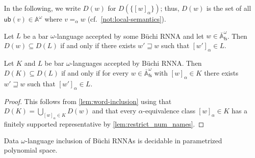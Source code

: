 \documentclass[final,a4paper,UKenglish,thm-restate,autoref,numberwithinsect]{lipics-v2021}
\newcommand{\barA}{\overline{\names}}
\newcommand{\ub}{\mathsf{ub}}
\numberwithin{equation}{section}
\newcommand{\seq}{\subseteq}
\newcommand{\fs}{\mathsf{fs}}
\newcommand{\+}[1]{\mathcal{#1}\xspace}
\newcommand{\names}{\mathbb{A}}
\theoremstyle{definition}
\begin{document}
\noindent In the following, we write $D(w)$ for $D(\{[w]_\alpha\})$; thus,
$D(w)$ is the set of all $\ub(v)\in \names^\omega$ where
$v=_\alpha w$ (cf.~\autoref{not:local-semantics}).
%
\begin{lemma}\label{lem:word-inclusion}
  Let $L$ be a bar $\omega$-language accepted by some Büchi RNNA and
  let $w\in \barA^\omega_\fs$. Then $D(w)\seq D(L)$ if and only if
  there exists $w'\sqsupseteq w$ such that $[w']_\alpha\in L$.
\end{lemma}
%

%
\begin{corollary}\label{cor:lang-inclusion}
  Let $K$ and $L$ be bar $\omega$-languages accepted by Büchi
  RNNA. Then $D(K)\seq D(L)$ if and only if for every
  $w\in \barA^\omega_\fs$ with $[w]_\alpha\in K$ there exists
  $w'\sqsupseteq w$ such that $[w']_\alpha\in L$.
\end{corollary}
%
\begin{proof}
  This follows from \autoref{lem:word-inclusion} using that
  $D(K)=\bigcup_{[w]_\alpha\in K} D(w)$ and that every
  $\alpha$-equivalence class $[w]_\alpha\in K$ has a finitely
  supported representative by \autoref{lem:restrict_num_names}.
\end{proof}
%
\begin{theorem}\label{thm:inclusion_decidable_local}
  Data $\omega$-language inclusion of Büchi RNNAs is decidable in parametrized
  polynomial space.
\end{theorem}
%
\end{document}
